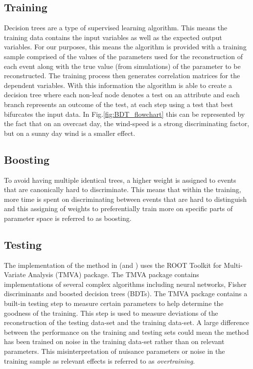 \documentclass[main.tex]{subfiles}
\begin{document}
\subsection{Training}
Decision trees are a type of supervised learning algorithm. This means the training data contains the input variables as well as the expected output variables. For our purposes, this means the algorithm is provided with a training sample comprised of the values of the parameters used for the reconstruction of each event along with the true value (from simulations) of the parameter to be reconstructed. The training process then generates correlation matrices for the dependent variables. With this information the algorithm is able to create a decision tree where each non-leaf node denotes a test on an attribute and each branch represents an outcome of the test, at each step using a test that best bifurcates the input data. In Fig.\ref{fig:BDT_flowchart} this can be represented by the fact that on an overcast day, the wind-speed is a strong discriminating factor, but on a sunny day wind is a smaller effect.

\subsection{Boosting}
To avoid having multiple identical trees, a higher weight is assigned to events that are canonically hard to discriminate. This means that within the training, more time is spent on discriminating between events that are hard to distinguish and this assigning of weights to preferentially train more on specific parts of parameter space is referred to as boosting.

\subsection{Testing}
The implementation of the \disp method in \vegas (and \ed) uses the ROOT Toolkit for Multi-Variate Analysis (TMVA) package. The TMVA package contains implementations of several complex algorithms including neural networks, Fisher discriminants and boosted decision trees (BDTs). The TMVA package contains a built-in testing step to measure certain parameters to help determine the goodness of the training. This step is used to measure deviations of the reconstruction of the testing data-set and the training data-set. A large difference between the performance on the training and testing sets could mean the method has been trained on noise in the training data-set rather than on relevant parameters. This misinterpretation of nuisance parameters or noise in the training sample as relevant effects is referred to as \textit{overtraining}.
\end{document}

